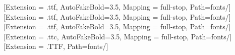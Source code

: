 \usepackage{siunitx}
\usepackage{relsize}
\usepackage{ulem}
\usepackage{array}
\usepackage{float}
\usepackage{cancel}
\usepackage{stackengine}
\stackMath

\usepackage{pifont}


\newCJKfontfamily{}[Extension = .ttf, AutoFakeBold=3.5, Mapping = full-stop, Path=fonts/]
\newCJKfontfamily{}[Extension = .ttf, AutoFakeBold=3.5, Mapping = full-stop, Path=fonts/]
\newCJKfontfamily{}[Extension = .ttf, AutoFakeBold=3.5, Mapping = full-stop, Path=fonts/]
\newCJKfontfamily{}[Extension = .ttc, AutoFakeBold=3.5, Mapping = full-stop, Path=fonts/]
\newCJKfontfamily{}[Extension = .TTF, Path=fonts/]




\newcommand{\chuhao}{\fontsize{42pt}{\baselineskip}\selectfont}
\newcommand{\xiaochuhao}{\fontsize{36pt}{\baselineskip}\selectfont}
\newcommand{\yihao}{\fontsize{26pt}{\baselineskip}\selectfont}
\newcommand{\erhao}{\fontsize{22pt}{\baselineskip}\selectfont}
\newcommand{\xiaoerhao}{\fontsize{18pt}{\baselineskip}\selectfont}
\newcommand{\sanhao}{\fontsize{16pt}{\baselineskip}\selectfont}
\newcommand{\sihao}{\fontsize{14pt}{\baselineskip}\selectfont}
\newcommand{\xiaosihao}{\fontsize{12pt}{\baselineskip}\selectfont}
\newcommand{\wuhao}{\fontsize{10.5pt}{\baselineskip}\selectfont}
\newcommand{\xiaowuhao}{\fontsize{9pt}{\baselineskip}\selectfont}
\newcommand{\liuhao}{\fontsize{7.5pt}{\baselineskip}\selectfont}
\newcommand{\xiaoliuhao}{\fontsize{6.5pt}{\baselineskip}\selectfont}
\newcommand{\qihao}{\fontsize{5.5pt}{\baselineskip}\selectfont}
\newcommand{\bahao}{\fontsize{5pt}{\baselineskip}\selectfont}

